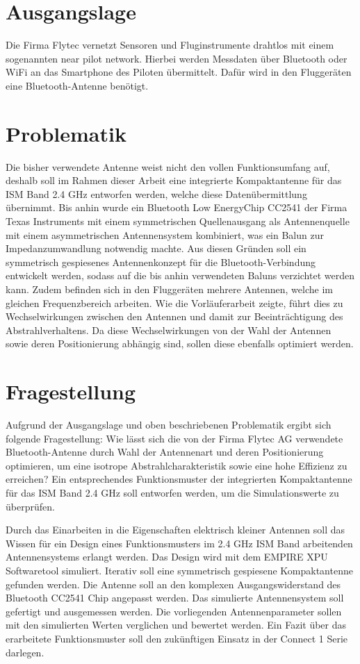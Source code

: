 \section{Ausgangslage}
Die Firma Flytec vernetzt Sensoren und Fluginstrumente drahtlos mit einem sogenannten \glqq near pilot network\grqq. Hierbei werden Messdaten über Bluetooth oder WiFi an das Smartphone des Piloten übermittelt. Dafür wird in den Fluggeräten eine Bluetooth-Antenne benötigt. 

\section{Problematik}
Die bisher verwendete Antenne weist nicht den vollen Funktionsumfang auf, deshalb soll im Rahmen dieser Arbeit eine integrierte Kompaktantenne für das ISM Band 2.4 GHz entworfen werden, welche diese Datenübermittlung übernimmt. Bis anhin wurde ein \glqq Bluetooth Low Energy\grqq Chip CC2541 der Firma Texas Instruments mit einem symmetrischen Quellenausgang als Antennenquelle mit einem asymmetrischen  Antennensystem kombiniert, was ein Balun zur Impedanzumwandlung notwendig machte.  Aus diesen Gründen soll ein symmetrisch gespiesenes Antennenkonzept für die Bluetooth-Verbindung entwickelt werden, sodass auf die bis anhin verwendeten Baluns verzichtet werden kann. Zudem befinden sich in den Fluggeräten mehrere Antennen, welche im gleichen Frequenzbereich arbeiten. Wie die Vorläuferarbeit zeigte, führt dies zu Wechselwirkungen zwischen den Antennen und damit zur Beeinträchtigung des Abstrahlverhaltens. Da diese Wechselwirkungen von der Wahl der Antennen sowie deren Positionierung abhängig sind, sollen diese ebenfalls optimiert werden. 

\section{Fragestellung}
Aufgrund der Ausgangslage und oben beschriebenen Problematik ergibt sich folgende Fragestellung: 
Wie lässt sich die von der Firma Flytec AG verwendete Bluetooth-Antenne durch Wahl der Antennenart und deren Positionierung optimieren, um eine isotrope Abstrahlcharakteristik sowie eine hohe Effizienz zu erreichen?
Ein entsprechendes Funktionsmuster der integrierten Kompaktantenne für das ISM Band 2.4 GHz soll entworfen werden, um die Simulationswerte zu überprüfen.


Durch das Einarbeiten in die Eigenschaften elektrisch kleiner Antennen soll das Wissen für ein Design eines Funktionsmusters  im 2.4 GHz ISM Band arbeitenden Antennensystems erlangt werden. Das Design wird mit dem EMPIRE XPU Softwaretool simuliert. Iterativ soll eine symmetrisch gespiesene Kompaktantenne gefunden werden. Die Antenne soll an den komplexen Ausgangswiderstand des Bluetooth CC2541 Chip angepasst werden. Das simulierte Antennensystem soll gefertigt und ausgemessen werden. Die vorliegenden Antennenparameter sollen mit den simulierten Werten verglichen und bewertet werden. Ein Fazit über das erarbeitete Funktionsmuster soll den zukünftigen Einsatz in der \glqq Connect 1 \grqq Serie darlegen.
